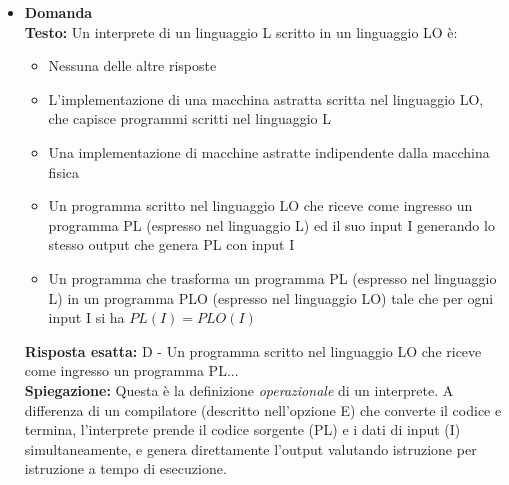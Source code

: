 \documentclass[12pt, a4paper]{article}
\newcounter{domandateoria}
\begin{document}
\begin{itemize}
    \item {}\textbf{Domanda \thedomandateoria} \\
    \textbf{Testo:} Un interprete di un linguaggio L scritto in un linguaggio LO è:
    \begin{itemize}
        \item[A)] Nessuna delle altre risposte
        \item[B)] L'implementazione di una macchina astratta scritta nel linguaggio LO, che capisce programmi scritti nel linguaggio L
        \item[C)] Una implementazione di macchine astratte indipendente dalla macchina fisica
        \item[D)] Un programma scritto nel linguaggio LO che riceve come ingresso un programma PL (espresso nel linguaggio L) ed il suo input I generando lo stesso output che genera PL con input I
        \item[D)] Un programma che trasforma un programma PL (espresso nel linguaggio L) in un programma PLO (espresso nel linguaggio LO) tale che per ogni input I si ha $PL(I)=PLO(I)$
    \end{itemize}
    \textbf{Risposta esatta:} D - Un programma scritto nel linguaggio LO che riceve come ingresso un programma PL... \\
    \textbf{Spiegazione:} Questa è la definizione \textit{operazionale} di un interprete. A differenza di un compilatore (descritto nell'opzione E) che converte il codice e termina, l'interprete prende il codice sorgente (PL) e i dati di input (I) simultaneamente, e genera direttamente l'output valutando istruzione per istruzione a tempo di esecuzione.
    \vspace{0.3cm}


\end{itemize}
\end{document}
